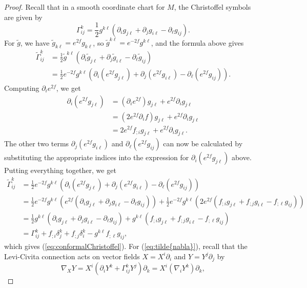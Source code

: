 \documentclass{amsart}
\numberwithin{equation}{section}
\newcommand{\del}{\partial}
\theoremstyle{plain}
\theoremstyle{definition}
\theoremstyle{remark}
\begin{document}
\begin{proof}
    Recall that in a smooth coordinate chart for $M$, the Christoffel symbols are given by
    \[\Gamma_{ij}^k = \frac{1}{2}g^{k \ell}\left(\del_ig_{j\ell} + \del_j g_{i\ell} - \del_\ell g_{ij}\right).\]
    For $\tilde{g}$, we have $\tilde{g}_{k\ell} = e^{2f} g_{k\ell}$, so $\tilde{g}^{k\ell} = e^{-2f} g^{k\ell}$, and the formula above gives
    \begin{align*}
        \widetilde{\Gamma}_{ij}^k &= \frac{1}{2}\tilde{g}^{k\ell}(\del_i \tilde{g}_{j\ell} + \del_j \tilde{g}_{i\ell} - \del_\ell \tilde{g}_{ij})\\
        &= \frac{1}{2}e^{-2f}g^{k\ell} \left(\del_i (e^{2f}g_{j\ell}) + \del_j (e^{2f} g_{i\ell}) - \del_\ell (e^{2f}g_{ij})\right).
    \end{align*}
    Computing $\del_i e^{2f}$, we get 
    \begin{align*}
        \del_i (e^{2f}g_{j\ell}) &= (\del_i e^{2f})g_{j\ell} + e^{2f} \del_i g_{j\ell}\\
        &= (2e^{2f} \del_i f)g_{j\ell} + e^{2f}\del_i g_{j \ell}\\
        &=2e^{2f}f_{;i}g_{j\ell} + e^{2f}\del_i g_{j \ell}.
    \end{align*}
    The other two terms $\del_j (e^{2f} g_{i\ell})$ and $\del_\ell (e^{2f}g_{ij})$ can now be calculated by substituting the appropriate indices into the expression for $\del_i (e^{2f}g_{j\ell})$ above. Putting everything together, we get
    \begin{align*}
        \widetilde{\Gamma}_{ij}^k
        &= \frac{1}{2}e^{-2f}g^{k\ell} \left(\del_i (e^{2f}g_{j\ell}) + \del_j (e^{2f} g_{i\ell}) - \del_\ell (e^{2f}g_{ij})\right)\\
        &= \frac{1}{2} e^{-2f}g^{k\ell}\left(e^{2f}(\del_ig_{j\ell} + \del_j g_{i\ell} - \del_\ell g_{ij})\right) + \frac{1}{2}e^{-2f}g^{k\ell}(2e^{2f}(f_{;i} g_{j\ell} + f_{;j} g_{i\ell} - f_{;\ell} g_{ij}))\\
        &= \frac{1}{2}g^{k \ell}\left(\del_ig_{j\ell} + \del_j g_{i\ell} - \del_\ell g_{ij}\right) + g^{k\ell}(f_{;i} g_{j\ell} + f_{;j} g_{i\ell} - f_{;\ell} g_{ij})\\
        &= \Gamma_{ij}^k + f_{;i}\delta_j^k + f_{;j} \delta_i^k - g^{k\ell}f_{;\ell}g_{ij},
    \end{align*}
    which gives (\ref{eq:conformalChristoffel}). For (\ref{eq:tilde{nabla}}), recall that the Levi-Civita connection acts on vector fields $X = X^i \del_i$ and $Y = Y^j \del_j$ by
    \[\nabla_X Y = X^i(\del_i Y^k + \Gamma^k_{ij} Y^j)\del_k = X^i(\nabla_i Y^k)\del_k,\]

\end{proof}
\end{document}
